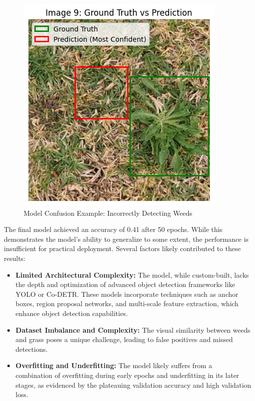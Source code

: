 \documentclass[conference]{IEEEtran}
\begin{document}
\begin{figure}[H]
    \centering
    \includegraphics[width=\columnwidth]{result4.png}
    \caption{Model Confusion Example: Incorrectly Detecting Weeds}
    \label{fig:result4}
\end{figure}

The final model achieved an accuracy of 0.41 after 50 epochs. While this demonstrates the model's ability to generalize to some extent, the performance is insufficient for practical deployment. Several factors likely contributed to these results:

\begin{itemize}
    \item \textbf{Limited Architectural Complexity:} The model, while custom-built, lacks the depth and optimization of advanced object detection frameworks like YOLO or Co-DETR. These models incorporate techniques such as anchor boxes, region proposal networks, and multi-scale feature extraction, which enhance object detection capabilities.
    \item \textbf{Dataset Imbalance and Complexity:} The visual similarity between weeds and grass poses a unique challenge, leading to false positives and missed detections.
    \item \textbf{Overfitting and Underfitting:} The model likely suffers from a combination of overfitting during early epochs and underfitting in its later stages, as evidenced by the plateauing validation accuracy and high validation loss.
\end{itemize}
\end{document}

